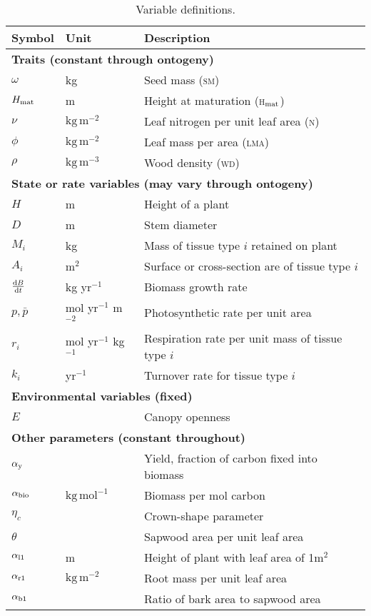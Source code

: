 \documentclass[9pt,twocolumn,twoside,lineno]{pnas-new}
\newcommand{\lma}{\textsc{lma}}
\newcommand{\wood}{\textsc{wd}}
\newcommand{\seed}{\textsc{sm}}
\newcommand{\hmat}{\textsc{h}$_{\rm mat}$}
\newcommand{\nitrogen}{\textsc{n}}
\begin{document}
\begin{table}[!hb]
 \caption{Variable definitions.}
\centering
\begin{tabular}{p{0.5cm}p{1.75cm}p{5cm}}
\toprule
Symbol & Unit & Description \\
\midrule
\multicolumn{3}{l}{\textbf{Traits (constant through ontogeny)}}\\
$\omega$ & kg & Seed mass ({\seed})  \\
$H_{{\rm mat}}$ & m & Height at maturation ({\hmat})\\
$\nu$ & $\mathrm{kg}\,\mathrm{m}^{-2}$ & Leaf nitrogen per unit leaf area ({\nitrogen})  \\
$\phi$ & $\mathrm{kg}\,\mathrm{m}^{-2}$ & Leaf mass per area ({\lma}) \\
$\rho$ & $\mathrm{kg}\,\mathrm{m}^{-3}$ & Wood density ({\wood})\\
\multicolumn{3}{l}{\textbf{State or rate variables (may vary through ontogeny)}} \\
$H$ & m & Height of a plant\\
$D$ & m & Stem diameter\\
$M_i$ & kg & Mass of tissue type $i$ retained on plant \\
$A_i$ & m$^2$ & Surface or cross-section are of tissue type $i$\\
$\frac{{\rm d}B}{{\rm d}t}$ & kg yr$^{-1}$& Biomass growth rate\\
$p,\bar{p}$ & mol yr$^{-1}$ m$^{-2}$ & Photosynthetic rate per unit area \\
$r_i$ & mol yr$^{-1}$ kg$^{-1}$  & Respiration rate per unit mass of tissue type $i$ \\
$k_i$ & yr$^{-1}$ & Turnover rate for tissue type $i$ \\
\multicolumn{3}{l}{\textbf{Environmental variables (fixed)}} \\
$E$ & & Canopy openness\\
\multicolumn{3}{l}{\textbf{Other parameters (constant throughout)}} \\
$\alpha_{\rm y}$ &  & Yield, fraction of carbon fixed into biomass\\
$\alpha_{\rm bio}$  & $\mathrm{kg}\,\mathrm{mol}^{-1}$ & Biomass per mol carbon \\
$\eta_c$ & & Crown-shape parameter\\
$\theta$ &  & Sapwood area per unit leaf area\\
$\alpha_{\rm l1}$ & m & Height of plant with leaf area of 1m$^2$ \\
$\alpha_{\rm r1}$ & $\mathrm{kg}\,\mathrm{m}^{-2}$ & Root mass per unit leaf area \\
$\alpha_{\rm b1}$ &  & Ratio of bark area to sapwood area\\
\bottomrule
\end{tabular}
\label{tab:definitions}
\end{table}
\end{document}

